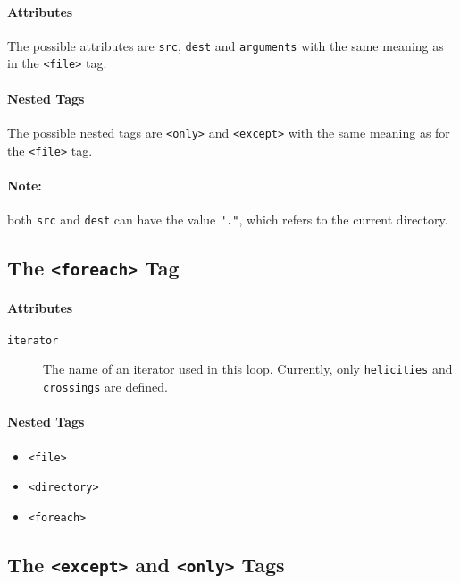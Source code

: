 \documentclass[11pt,a4paper]{refrep}
\begin{document}
\paragraph{Attributes}
The possible attributes are \texttt{src}, \texttt{dest} and
\texttt{arguments} with the same meaning as in the \texttt{<file>} tag.

\paragraph{Nested Tags}
The possible nested tags are \texttt{<only>} and \texttt{<except>}
with the same meaning as for the \texttt{<file>} tag.

\paragraph{Note:} both \texttt{src} and \texttt{dest} can have the
value \texttt{"."}, which refers to the current directory.

\subsection{The \texttt{<foreach>} Tag}
\paragraph{Attributes}
\begin{description}
\item[\texttt{iterator}] The name of an iterator used in this loop.
Currently, only \texttt{helicities} and \texttt{crossings} are defined.
\end{description}

\paragraph{Nested Tags}
\begin{itemize}
\item \texttt{<file>}
\item \texttt{<directory>}
\item \texttt{<foreach>}
\end{itemize}

\subsection{The \texttt{<except>} and \texttt{<only>} Tags}
\end{document}
